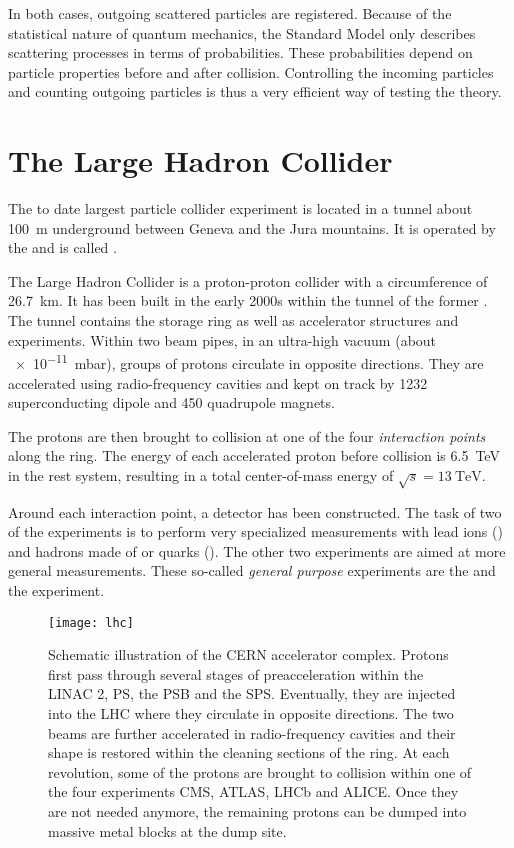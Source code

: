 In both cases, outgoing scattered particles are registered. 
Because of the statistical nature of quantum mechanics, the Standard Model only describes scattering processes in terms of probabilities. These probabilities depend on particle properties before and after collision. 
Controlling the incoming particles and counting outgoing particles is thus a very efficient way of testing the theory.

\section{The Large Hadron Collider}
The to date largest particle collider experiment is located in a tunnel about \SI{100}{\m} underground between Geneva and the Jura mountains. It is operated by the  and is called .

The Large Hadron Collider is a proton-proton collider with a circumference of \SI{26.7}{\km}. It has been built in the early 2000s within the tunnel of the former . The tunnel contains the storage ring as well as accelerator structures and experiments. Within two beam pipes, in an ultra-high vacuum (about \SI{e-11}{\milli\bar}), groups of protons circulate in opposite directions. They are accelerated using radio-frequency cavities and kept on track by \num{1232} superconducting dipole and \num{450} quadrupole magnets.

The protons are then brought to collision at one of the four \emph{interaction points} along the ring. The energy of each accelerated proton before collision is \SI{6.5}{\TeV} in the rest system, resulting in a total center-of-mass energy of $\sqrt{s} = \SI{13}{\TeV}$.

Around each interaction point, a detector has been constructed. The task of two of the experiments is to perform very specialized measurements with lead ions () and hadrons made of \Pcharm or \Pbottom quarks (). 
The other two experiments are aimed at more general measurements. These so-called \emph{general purpose} experiments are the  and the  experiment\cite{Evans:LHCMachine}. 

\begin{figure}
    \centering
    \texttt{[image: lhc]}
    \caption{Schematic illustration of the \acs{CERN} accelerator complex\cite{Ley:CERNAccelerators,Caron:LHCLayout,DeMelis:CERNacceleratorcomplex}. Protons first pass through several stages of preacceleration within the \ac{LINAC} 2, \ac{PS}, the \ac{PSB} and the \ac{SPS}. Eventually, they are injected into the \ac{LHC} where they circulate in opposite directions. The two beams are further accelerated in radio-frequency cavities and their shape is restored within the cleaning sections of the ring. At each revolution, some of the protons are brought to collision within one of the four experiments \acs{CMS}, \acs{ATLAS}, \acs{LHCb} and \acs{ALICE}. Once they are not needed anymore, the remaining protons can be dumped into massive metal blocks at the dump site.
    }
    \label{fig:LHC}
\end{figure}

